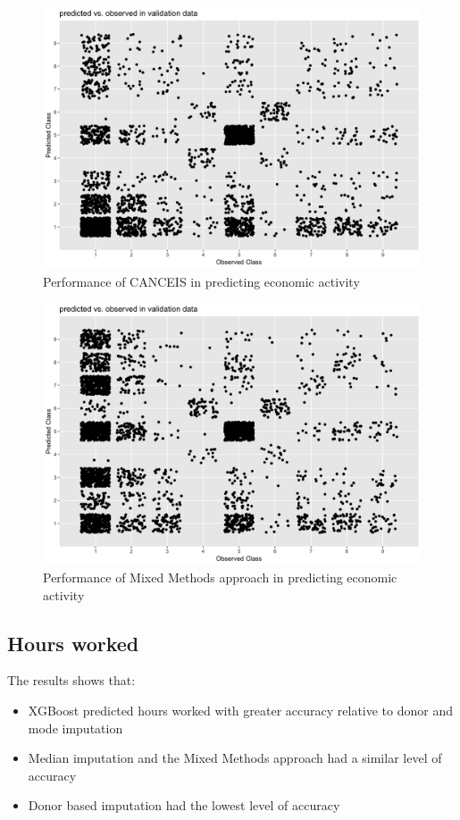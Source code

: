 \documentclass[]{book}
\providecommand{\tightlist}{%
  \setlength{\itemsep}{0pt}\setlength{\parskip}{0pt}}
\begin{document}
\begin{figure}
\centering
\includegraphics{images/EACANCEISqplot.png}
\caption{Performance of CANCEIS in predicting economic activity}
\end{figure}

\begin{figure}
\centering
\includegraphics{images/EACANCEISXGqplot.png}
\caption{Performance of Mixed Methods approach in predicting economic
activity}
\end{figure}

\subsection{Hours worked}\label{hours-worked}

The results shows that:

\begin{itemize}
\tightlist
\item
  XGBoost predicted hours worked with greater accuracy relative to donor
  and mode imputation\\
\item
  Median imputation and the Mixed Methods approach had a similar level
  of accuracy\\
\item
  Donor based imputation had the lowest level of accuracy
\end{itemize}
\end{document}
